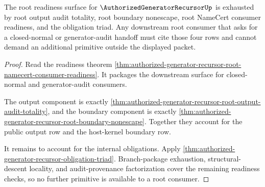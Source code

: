 \begin{theorem}
\label{thm:authorized-generator-recursor-root-readiness-exhaustion}
The root readiness surface for $\AuthorizedGeneratorRecursorUp$ is exhausted by root output audit totality, root boundary nonescape, root NameCert consumer readiness, and the obligation triad. Any downstream root consumer that asks for a closed-normal or generator-audit handoff must cite those four rows and cannot demand an additional primitive outside the displayed packet.
\end{theorem}
\begin{proof}
Read the readiness theorem \autoref{thm:authorized-generator-recursor-root-namecert-consumer-readiness}. It packages the downstream surface for closed-normal and generator-audit consumers.

The output component is exactly \autoref{thm:authorized-generator-recursor-root-output-audit-totality}, and the boundary component is exactly \autoref{thm:authorized-generator-recursor-root-boundary-nonescape}. Together they account for the public output row and the host-kernel boundary row.

It remains to account for the internal obligations. Apply \autoref{thm:authorized-generator-recursor-obligation-triad}. Branch-package exhaustion, structural-descent locality, and audit-provenance factorization cover the remaining readiness checks, so no further primitive is available to a root consumer.
\end{proof}

